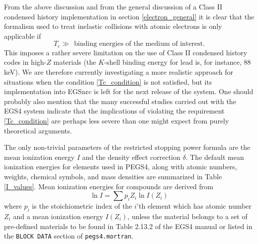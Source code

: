 From the above discussion and from the general discussion
of a Class II condensed history implementation in section
\ref{electron_general} it is clear that the formalism
used to treat inelastic collisions with atomic electrons
is only applicable if
\begin{equation}
\label{Tc_condition}
T_c \gg ~~\text{binding energies of the medium of interest}.
\end{equation}
This imposes a rather severe limitation on the use
of Class II condensed history codes in high-$Z$ materials
(the $K$-shell binding energy for lead is, for instance, 88 keV).
We are therefore currently investigating a more realistic approach for
situations when the condition \eqref{Tc_condition} is not
satisfied, but its implementation into EGSnrc is left for the
next release of the system. One should probably also mention
that the many successful studies carried out with the
EGS4 system indicate that the implications of violating
the requirement \eqref{Tc_condition} are perhaps less
severe than one might expect from purely theoretical arguments.

The only non-trivial parameters of the restricted stopping
power formula are the mean ionization energy $I$ and the
density effect correction $\delta$. The default mean ionization
energies for elements used in PEGS4, along with atomic numbers,
weights, chemical symbols, and mass densities are summarized
in Table \ref{I_values}. Mean ionization energies for
compounds are derived from
\begin{equation}
\ln I = \sum p_i Z_i \ln I(Z_i)
\end{equation}
where $p_i$ is the stoichiometric index of the $i$'th element
which has atomic number $Z_i$ and a mean ionization energy $I(Z_i)$,
unless the material belongs to a set of pre-defined materials
to be found in Table 2.13.2 of the EGS4 manual \cite{Ne85} or listed in the
{\tt BLOCK DATA} section of {\tt pegs4.mortran}.

